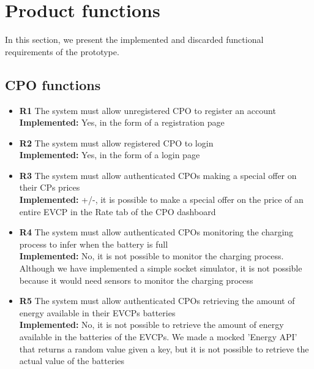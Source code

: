 \section{Product functions}
In this section, we present the implemented and discarded functional requirements of the prototype.

\subsection{CPO functions}

\begin{itemize}
    \item        \textbf{R1}  The system must allow unregistered CPO to register an account                                                                                            \\
          \textbf{Implemented:} Yes, in the form of a registration page
    \item        \textbf{R2}  The system must allow registered CPO to login                                                                                                            \\
          \textbf{Implemented:} Yes, in the form of a login page
    \item        \textbf{R3}  The system must allow authenticated CPOs making a special offer on their CPs prices                                                                      \\
          \textbf{Implemented:} +/-, it is possible to make a special offer on the price of an entire EVCP in the Rate tab of the CPO dashboard
    \item        \textbf{R4}  The system must allow authenticated CPOs monitoring the charging process to infer when the battery is full                                               \\
          \textbf{Implemented:} No, it is not possible to monitor the charging process. Although we have implemented a simple socket simulator, it is not possible because it would need sensors to monitor the charging process
    \item        \textbf{R5}  The system must allow authenticated CPOs retrieving the amount of energy available in their EVCPs batteries                                              \\
          \textbf{Implemented:} No, it is not possible to retrieve the amount of energy available in the batteries of the EVCPs. We made a mocked 'Energy API' that returns a random value given a key, but it is not possible to retrieve the actual value of the batteries

\end{itemize}
